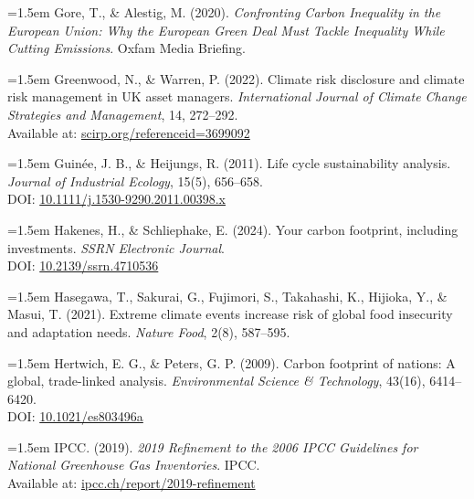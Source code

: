 \documentclass[12pt,a4paper]{article}%
\begin{document}
\vspace{0.5em}
{\small
\noindent
\parbox{\linewidth}{
\hangindent=1.5em
Gore, T., \& Alestig, M. (2020). \textit{Confronting Carbon Inequality in the European Union: Why the European Green Deal Must Tackle Inequality While Cutting Emissions}. Oxfam Media Briefing.
}
}

\vspace{0.5em}
{\small
\noindent
\parbox{\linewidth}{
\hangindent=1.5em
Greenwood, N., \& Warren, P. (2022). Climate risk disclosure and climate risk management in UK asset managers. \textit{International Journal of Climate Change Strategies and Management}, 14, 272–292. \\
Available at: \href{https://www.scirp.org/reference/referencespapers?referenceid=3699092}{scirp.org/referenceid=3699092}
}
}

\vspace{0.5em}
{\small
\noindent
\parbox{\linewidth}{
\hangindent=1.5em
Guinée, J. B., \& Heijungs, R. (2011). Life cycle sustainability analysis. \textit{Journal of Industrial Ecology}, 15(5), 656–658. \\
DOI: \href{https://doi.org/10.1111/j.1530-9290.2011.00398.x}{10.1111/j.1530-9290.2011.00398.x}
}
}

\vspace{0.5em}
{\small
\noindent
\parbox{\linewidth}{
\hangindent=1.5em
Hakenes, H., \& Schliephake, E. (2024). Your carbon footprint, including investments. \textit{SSRN Electronic Journal}. \\
DOI: \href{https://doi.org/10.2139/ssrn.4710536}{10.2139/ssrn.4710536}
}
}

\vspace{0.5em}
{\small
\noindent
\parbox{\linewidth}{
\hangindent=1.5em
Hasegawa, T., Sakurai, G., Fujimori, S., Takahashi, K., Hijioka, Y., \& Masui, T. (2021). Extreme climate events increase risk of global food insecurity and adaptation needs. \textit{Nature Food}, 2(8), 587–595.
}
}
\vspace{0.5em}
{\small
\noindent
\parbox{\linewidth}{
\hangindent=1.5em
Hertwich, E. G., \& Peters, G. P. (2009). Carbon footprint of nations: A global, trade-linked analysis. \textit{Environmental Science \& Technology}, 43(16), 6414–6420. \\
DOI: \href{https://doi.org/10.1021/es803496a}{10.1021/es803496a}
}
}

\vspace{0.5em}
{\small
\noindent
\parbox{\linewidth}{
\hangindent=1.5em
IPCC. (2019). \textit{2019 Refinement to the 2006 IPCC Guidelines for National Greenhouse Gas Inventories}. IPCC. \\
Available at: \href{https://www.ipcc.ch/report/2019-refinement-to-the-2006-ipcc-guidelines-for-national-greenhouse-gas-inventories/}{ipcc.ch/report/2019-refinement}
}
}
\end{document}
